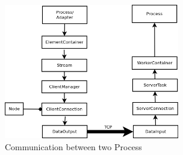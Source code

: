 \begin{figure}[!tii]
        \centering
        \includegraphics[width=3.0in]{interprocess.png}
        \caption{Communication between two Process}
        \label{interprocess}
\end{figure}
